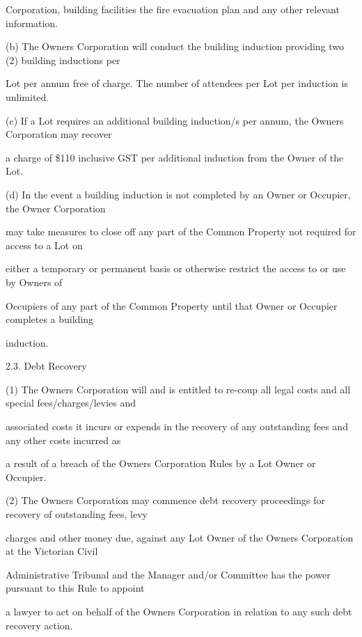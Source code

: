 \documentclass{article}
\begin{document}
{\fontsize{10.02}{1}Corporation, building facilities the fire evacuation plan and any other relevant information. }

{\fontsize{9.962}{1}(b) The Owners Corporation will conduct the building induction providing two (2) building inductions per }

{\fontsize{10.02}{1}Lot per annum free of charge. The number of attendees per Lot per induction is unlimited. }

{\fontsize{9.962}{1}(c) If a Lot requires an additional building induction/s per annum, the Owners Corporation may recover }

{\fontsize{10.02}{1}a charge of \$110 inclusive GST per additional induction from the Owner of the Lot. }

{\fontsize{9.962}{1}(d) In the event a building induction is not completed by an Owner or Occupier, the Owner Corporation }

{\fontsize{10.02}{1}may take measures to close off any part of the Common Property not required for access to a Lot on }

{\fontsize{10.02}{1}either a temporary or permanent basis or otherwise restrict the access to or use by Owners of }

{\fontsize{10.02}{1}Occupiers of any part of the Common Property until that Owner or Occupier completes a building }

{\fontsize{10.02}{1}induction. }

{\fontsize{9.99}{1}2.3. Debt Recovery }

{\fontsize{9.962}{1}(1) The Owners Corporation will and is entitled to re-coup all legal costs and all special fees/charges/levies and }

{\fontsize{10.02}{1}associated costs it incurs or expends in the recovery of any outstanding fees and any other costs incurred as }

{\fontsize{10.02}{1}a result of a breach of the Owners Corporation Rules by a Lot Owner or Occupier. }

{\fontsize{9.962}{1}(2) The Owners Corporation may commence debt recovery proceedings for recovery of outstanding fees, levy }

{\fontsize{10.02}{1}charges and other money due, against any Lot Owner of the Owners Corporation at the Victorian Civil }

{\fontsize{10.02}{1}Administrative Tribunal and the Manager and/or Committee has the power pursuant to this Rule to appoint }

{\fontsize{10.02}{1}a lawyer to act on behalf of the Owners Corporation in relation to any such debt recovery action. }
\end{document}
